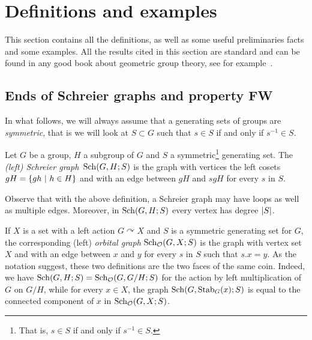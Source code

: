 %
%
%
%
%
%
%
%
%
%
\section{Definitions and examples}
This section contains all the definitions, as well as some useful preliminaries facts and some examples.
All the results cited in this section are standard and can be found in any good book about geometric group theory, see for example~\cite{}. 
%
%
%
%
%
%
%
%
%
%
\subsection{Ends of Schreier graphs and property FW}
\label{Subsection:FW}
%
%
%
%
%
In what follows, we will always assume that a generating sets of groups are \emph{symmetric}, that is we will look at $S\subset G$ such that $s\in S$ if and only if $s^{-1}\in S$.
%
%
\begin{defn}
Let $G$ be a group, $H$ a subgroup of $G$ and $S$ a symmetric\footnote{That is, $s\in S$ if and only if $s^{-1}\in S$.} generating set. The \emph{(left) Schreier graph} $\operatorname{Sch}(G,H;S)$ is the graph with vertices the left cosets $gH=\{gh\ |\ h\in H\}$ and with an edge between $gH$ and $sgH$ for every $s$ in $S$.
\end{defn}
%
%
Observe that with the above definition, a Schreier graph may have loops as well as multiple edges. Moreover, in $\operatorname{Sch}(G,H;S)$ every vertex has degree $\lvert S\rvert$.

If $X$ is a set with a left action $G\curvearrowright X$ and $S$ is a symmetric generating set for $G$, the corresponding (left) \emph{orbital graph} $\operatorname{Sch}_{\mathcal O}(G,X;S)$ is the graph with vertex set $X$ and with an edge between $x$ and $y$ for every $s$ in $S$ such that $s.x=y$.
As the notation suggest, these two definitions are the two faces of the same coin. Indeed, we have $\operatorname{Sch}(G,H;S)=\operatorname{Sch}_{\mathcal O}(G,G/H;S)$ for the  action by left multiplication of $G$ on $G/H$, while   for every $x\in X$, the graph $\operatorname{Sch}(G,\operatorname{Stab}_G(x);S)$ is equal to the connected component of $x$ in $\operatorname{Sch}_{\mathcal O}(G,X;S)$.

